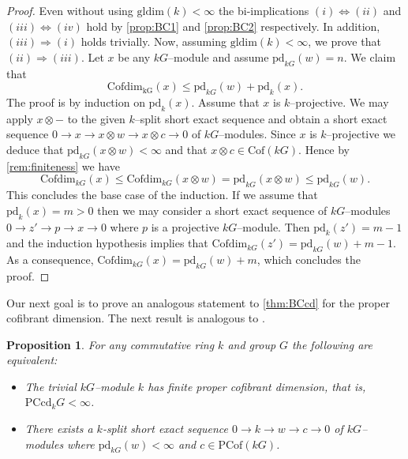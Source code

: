 \documentclass{amsart}
\numberwithin{equation}{section}%
\newtheorem{proposition}[equation]{Proposition}
\theoremstyle{remark}
\begin{document}
{\begin{proof}
Even without using $\mathrm{gldim}(k)<\infty$ the bi-implications $(i)\Leftrightarrow (ii)$ and $(iii)\Leftrightarrow (iv)$ hold by \cref{prop:BC1} and \cref{prop:BC2} respectively. In addition, $(iii)\Rightarrow (i)$ holds trivially. Now, assuming $\mathrm{gldim}(k)<\infty$, we prove that $(ii)\Rightarrow (iii)$. Let $x$ be any $kG$--module and assume $\mathrm{pd}_{kG}(w)=n.$ We claim that  
\[
\mathrm{Cofdim_{kG}}(x)\leqslant \mathrm{pd}_{kG}(w)+\mathrm{pd}_{k}(x).
\]
The proof is by induction on $\mathrm{pd}_{k}(x)$. Assume that $x$ is $k$--projective. We may apply $x\otimes -$ to the given $k$--split short exact sequence and obtain a short exact sequence $0\rightarrow x\rightarrow x\otimes w\rightarrow x\otimes c\rightarrow 0$ of $kG$--modules. Since $x$ is $k$--projective we deduce that $\mathrm{pd}_{kG}(x\otimes w)<\infty$ and that $x\otimes c\in\mathrm{Cof}(kG)$. Hence by \cref{rem:finiteness} we have
\[
\mathrm{Cofdim}_{kG}(x)\leqslant\mathrm{Cofdim}_{kG}(x\otimes w)=\mathrm{pd}_{kG}(x\otimes w)\leqslant\mathrm{pd}_{kG}(w).  
\]
This concludes the base case of the induction.
If we assume that $\mathrm{pd}_k(x)=m>0$ then we may consider a short exact sequence of $kG$--modules $0\rightarrow z'\rightarrow p \rightarrow x\rightarrow 0$ where $p$ is a projective $kG$--module. Then $\mathrm{pd}_k(z')=m-1$ and the induction hypothesis implies that $\mathrm{Cofdim}_{kG}(z')=\mathrm{pd}_{kG}(w)+m-1$. As a consequence, $\mathrm{Cofdim}_{kG}(x)=\mathrm{pd}_{kG}(w)+m$, which concludes the proof.
\end{proof}

Our next goal is to prove an analogous statement to  \cref{thm:BCcd} for the proper cofibrant dimension. The next result is analogous to \cite[Proposition~2.2(i)]{ET_cof}.



\begin{proposition}
\label{prop:PC1}
For any commutative ring $k$ and group $G$ the following are equivalent:
\begin{itemize}
    \item[(i)] The trivial $kG$--module $k$ has finite proper cofibrant dimension, that is, $\mathrm{PCcd}_{k}G<\infty$.
    \item[(ii)] There exists a $k$-split short exact sequence $0\rightarrow k\rightarrow w\rightarrow c\rightarrow 0$ of $kG$--modules where $\mathrm{pd}_{kG}(w)<\infty$ and $c\in\mathrm{PCof}(kG)$.
\end{itemize}
\end{proposition}

}
\end{document}
